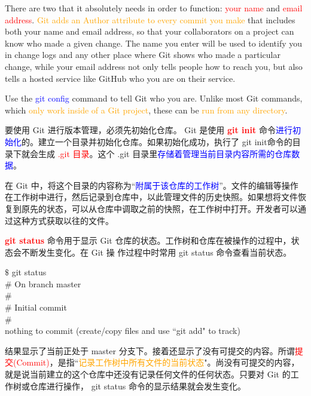 \documentclass[12pt,a4paper]{article}
\begin{document}
There are two that it absolutely needs in order to function: \textcolor{red}{your name} and \textcolor{red}{email address}. \textcolor{orange}{Git adds an Author attribute to every commit you make} that includes both your name and email address, so that your collaborators on a project can know who made a given change. The name you enter will be used to identify you in change logs and any other place where Git shows who made a particular change, while your email address
not only tells people how to reach you, but also tells a hosted service like GitHub who you are on their service.

Use the \textcolor{blue}{git config} command to tell Git who you are. Unlike most Git commands, which \textcolor{orange}{only work inside of a Git project}, these can be \textcolor{orange}{run from any directory}. 

要使用 Git 进行版本管理，必须先初始化仓库。 Git 是使用 \textcolor{red}{\bf git init} 命令\textcolor{blue}{进行初始化}的。建立一个目录并初始化仓库。如果初始化成功，执行了 git init命令的目录下就会生成 \textcolor{red}{.git 目录}。这个 .git 目录里\textcolor{blue}{存储着管理当前目录内容所需的仓库数据}。

在 Git 中，将这个目录的内容称为``\textcolor{blue}{附属于该仓库的工作树}”。文件的编辑等操作在工作树中进行，然后记录到仓库中，以此管理文件的历史快照。如果想将文件恢复到原先的状态，可以从仓库中调取之前的快照，在工作树中打开。开发者可以通过这种方式获取以往的文件。

 \textcolor{red}{\bf git status} 命令用于显示 Git 仓库的状态。工作树和仓库在被操作的过程中，状态会不断发生变化。在 Git 操
作过程中时常用 git status 命令查看当前状态。
\begin{tcolorbox}[colback=green!5,colframe=green!40!black,title= ]
$\$$ git status \\
$\#$ On branch master \\
$\#$  \\
$\#$  Initial commit \\
$\#$  \\
nothing to commit (create/copy files and use ``git add" to track) 
\end{tcolorbox}
结果显示了当前正处于 master 分支下。接着还显示了没有可提交的内容。所谓\textcolor{red}{提交(Commit)}，是指``\textcolor{orange}{记录工作树中所有文件的当前状态}"。尚没有可提交的内容，就是说当前建立的这个仓库中还没有记录任何文件的任何状态。只要对 Git 的工作树或仓库进行操作， git status 命令的显示结果就会发生变化。
\end{document}
